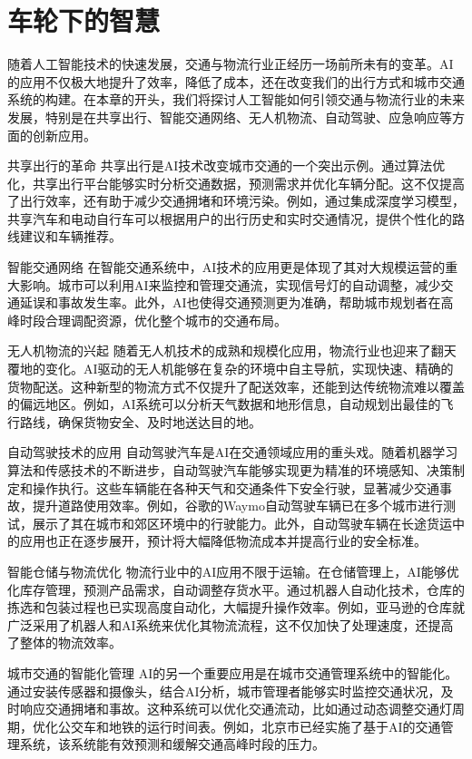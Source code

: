 \setchapterpreamble[u]{\margintoc}
\chapter{车轮下的智慧}

随着人工智能技术的快速发展，交通与物流行业正经历一场前所未有的变革。AI的应用不仅极大地提升了效率，降低了成本，还在改变我们的出行方式和城市交通系统的构建。在本章的开头，我们将探讨人工智能如何引领交通与物流行业的未来发展，特别是在共享出行、智能交通网络、无人机物流、自动驾驶、应急响应等方面的创新应用。

共享出行的革命
共享出行是AI技术改变城市交通的一个突出示例。通过算法优化，共享出行平台能够实时分析交通数据，预测需求并优化车辆分配。这不仅提高了出行效率，还有助于减少交通拥堵和环境污染。例如，通过集成深度学习模型，共享汽车和电动自行车可以根据用户的出行历史和实时交通情况，提供个性化的路线建议和车辆推荐。

智能交通网络
在智能交通系统中，AI技术的应用更是体现了其对大规模运营的重大影响。城市可以利用AI来监控和管理交通流，实现信号灯的自动调整，减少交通延误和事故发生率。此外，AI也使得交通预测更为准确，帮助城市规划者在高峰时段合理调配资源，优化整个城市的交通布局。

无人机物流的兴起
随着无人机技术的成熟和规模化应用，物流行业也迎来了翻天覆地的变化。AI驱动的无人机能够在复杂的环境中自主导航，实现快速、精确的货物配送。这种新型的物流方式不仅提升了配送效率，还能到达传统物流难以覆盖的偏远地区。例如，AI系统可以分析天气数据和地形信息，自动规划出最佳的飞行路线，确保货物安全、及时地送达目的地。

自动驾驶技术的应用
自动驾驶汽车是AI在交通领域应用的重头戏。随着机器学习算法和传感技术的不断进步，自动驾驶汽车能够实现更为精准的环境感知、决策制定和操作执行。这些车辆能在各种天气和交通条件下安全行驶，显著减少交通事故，提升道路使用效率。例如，谷歌的Waymo自动驾驶车辆已在多个城市进行测试，展示了其在城市和郊区环境中的行驶能力。此外，自动驾驶车辆在长途货运中的应用也正在逐步展开，预计将大幅降低物流成本并提高行业的安全标准。

智能仓储与物流优化
物流行业中的AI应用不限于运输。在仓储管理上，AI能够优化库存管理，预测产品需求，自动调整存货水平。通过机器人自动化技术，仓库的拣选和包装过程也已实现高度自动化，大幅提升操作效率。例如，亚马逊的仓库就广泛采用了机器人和AI系统来优化其物流流程，这不仅加快了处理速度，还提高了整体的物流效率。

城市交通的智能化管理
AI的另一个重要应用是在城市交通管理系统中的智能化。通过安装传感器和摄像头，结合AI分析，城市管理者能够实时监控交通状况，及时响应交通拥堵和事故。这种系统可以优化交通流动，比如通过动态调整交通灯周期，优化公交车和地铁的运行时间表。例如，北京市已经实施了基于AI的交通管理系统，该系统能有效预测和缓解交通高峰时段的压力。

